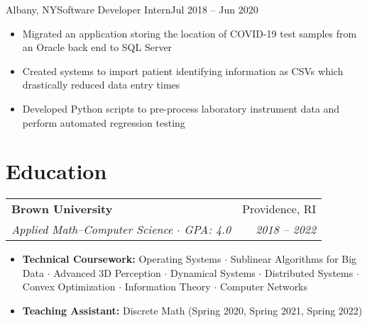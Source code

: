 \documentclass[letterpaper,11pt]{article}
\makeatletter
\newcommand{\resumeItem}[2]{
  \item\small{
    \textbf{#1}{#2 \vspace{-5pt}}
  }
}
\newcommand{\resumeSubheading}[4]{
    \vspace{3pt} 
    \begin{tabular*}{0.97\textwidth}{l@{\extracolsep{\fill}}r}
      \textbf{#1} & #2 \\
      \textit{\small#3} & \textit{\small #4} \\
    \end{tabular*}\vspace{-3pt}
}
\newcommand{\resumeSubheadingSimple}[2]{
  \vspace{-1pt}\item
    \begin{tabular*}{0.97\textwidth}{l@{\extracolsep{\fill}}r}
      \textbf{#1} & \textit{\small#2}\\
    \end{tabular*}\vspace{-3pt}
}
\newcommand{\resumeSubHeadingListStart}{}
\newcommand{\resumeSubHeadingListEnd}{}
\newcommand{\resumeItemListStart}{\begin{itemize}}
\newcommand{\resumeItemListEnd}{\end{itemize}}
\makeatother
\begin{document}
    {Albany, NY}{Software Developer Intern}{Jul 2018 -- Jun 2020}
      \resumeItemListStart
        \resumeItem{}
        {Migrated an application storing the location of COVID-19 test samples from an Oracle back end to SQL Server}
        \resumeItem{}
        {Created systems to import patient identifying information as CSVs which drastically reduced data entry times}
        \resumeItem{}
        {Developed Python scripts to pre-process laboratory instrument data and perform automated regression testing}
      \resumeItemListEnd
  \resumeSubHeadingListEnd

\section{Education}
  \resumeSubHeadingListStart
    \resumeSubheading
        {Brown University}{Providence, RI}
        {Applied Math--Computer Science $\cdot$ GPA: 4.0}{2018 -- 2022}
        \resumeItemListStart
            \resumeItem{Technical Coursework: }
            {Operating Systems $\cdot$ Sublinear Algorithms for Big Data $\cdot$ Advanced 3D Perception $\cdot$ Dynamical Systems $\cdot$ Distributed Systems $\cdot$ Convex Optimization $\cdot$ Information Theory $\cdot$ Computer Networks}
            \resumeItem{Teaching Assistant: } {Discrete Math (Spring 2020, Spring 2021, Spring 2022)}
        \resumeItemListEnd
   

  \resumeSubHeadingListEnd
\end{document}
